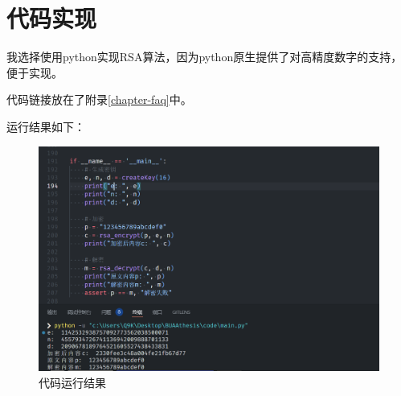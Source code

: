 \chapter{代码实现}

我选择使用python实现RSA算法，因为python原生提供了对高精度数字的支持，便于实现。

代码链接放在了附录\ref{chapter-faq}中。

运行结果如下：

\begin{figure}[htbp]
    \centering
    \includegraphics[scale=0.8]{data/image/code_result.jpg}
    \caption{代码运行结果}
    \label{figure1}
\end{figure}